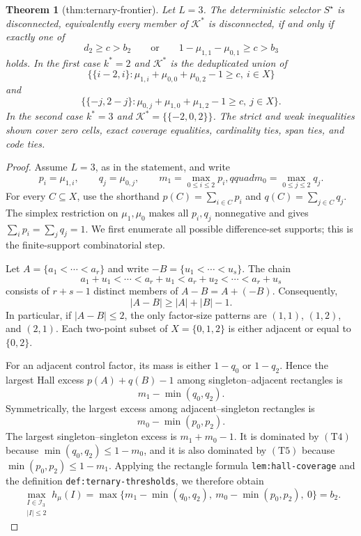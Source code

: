 \documentclass{article}
\newtheorem{theorem}{Theorem}
\begin{document}
\begin{theorem}[thm:ternary-frontier]\label{thm:ternary-frontier}
Let \(L=3\). The deterministic selector \(S^\star\) is disconnected, equivalently every member of \(\mathcal K^*\) is disconnected, if and only if exactly one of \[d_2\geq c>b_2\qquad\text{or}\qquad1-\mu_{1,1}-\mu_{0,1}\geq c>b_3\] holds. In the first case \(k^*=2\) and \(\mathcal K^*\) is the deduplicated union of \[\bigl\{\{i-2,i\}:\mu_{1,i}+\mu_{0,0}+\mu_{0,2}-1\geq c,\ i\in X\bigr\}\] and \[\bigl\{\{-j,2-j\}:\mu_{0,j}+\mu_{1,0}+\mu_{1,2}-1\geq c,\ j\in X\bigr\}.\] In the second case \(k^*=3\) and \(\mathcal K^*=\{\{-2,0,2\}\}\). The strict and weak inequalities shown cover zero cells, exact coverage equalities, cardinality ties, span ties, and code ties.
\end{theorem}
\begin{proof}
Assume \(L=3\), as in the statement, and write
\[
p_i=\mu_{1,i},\qquad q_j=\mu_{0,j},\qquad
m_1=\max_{0\leq i\leq2}p_i,qquad m_0=\max_{0\leq j\leq2}q_j.
\tag{T1}
\]
For every \(C\subseteq X\), use the shorthand \(p(C)=\sum_{i\in C}p_i\) and \(q(C)=\sum_{j\in C}q_j\).  The simplex restriction on \(\mu_1,\mu_0\) makes all \(p_i,q_j\) nonnegative and gives \(\sum_i p_i=\sum_jq_j=1\).  We first enumerate all possible difference-set supports; this is the finite-support combinatorial step.

Let \(A=\{a_1<\cdots<a_r\}\) and write \(-B=\{u_1<\cdots<u_s\}\).  The chain
\[
a_1+u_1<\cdots<a_r+u_1<a_r+u_2<\cdots<a_r+u_s
\tag{T2}
\]
consists of \(r+s-1\) distinct members of \(A-B=A+(-B)\).  Consequently,
\[
|A-B|\geq |A|+|B|-1.
\tag{T3}
\]
In particular, if \(|A-B|\leq2\), the only factor-size patterns are \((1,1)\), \((1,2)\), and \((2,1)\).  Each two-point subset of \(X=\{0,1,2\}\) is either adjacent or equal to \(\{0,2\}\).

For an adjacent control factor, its mass is either \(1-q_0\) or \(1-q_2\).  Hence the largest Hall excess \(p(A)+q(B)-1\) among singleton--adjacent rectangles is
\[
m_1-\min(q_0,q_2).
\tag{T4}
\]
Symmetrically, the largest excess among adjacent--singleton rectangles is
\[
m_0-\min(p_0,p_2).
\tag{T5}
\]
The largest singleton--singleton excess is \(m_1+m_0-1\).  It is dominated by \((\mathrm{T4})\) because \(\min(q_0,q_2)\leq1-m_0\), and it is also dominated by \((\mathrm{T5})\) because \(\min(p_0,p_2)\leq1-m_1\).  Applying the rectangle formula \texttt{lem:hall-coverage} and the definition \texttt{def:ternary-thresholds}, we therefore obtain
\[
\max_{\substack{I\in\mathcal I_3\\ |I|\leq2}}h_\mu(I)
=\max\{m_1-\min(q_0,q_2),\ m_0-\min(p_0,p_2),\ 0\}
=b_2.
\tag{T6}
\]


\end{proof}
\end{document}
